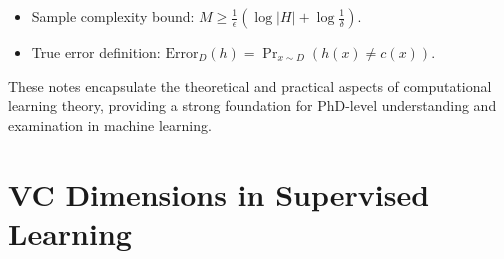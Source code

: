 \documentclass[
  12pt,
]{report}
\providecommand{\tightlist}{%
  \setlength{\itemsep}{0pt}\setlength{\parskip}{0pt}}
\begin{document}
\begin{enumerate}
\begin{itemize}
    \begin{itemize}
    \tightlist
    \item
      Sample complexity bound: \(M \geq \frac{1}{\epsilon}(\log|H| + \log\frac{1}{\delta})\).
    \item
      True error definition: \(\text{Error}_D(h) = \Pr_{x \sim D}(h(x) \neq c(x))\).
    \end{itemize}
  \end{itemize}
\end{enumerate}

These notes encapsulate the theoretical and practical aspects of computational learning theory, providing a strong foundation for PhD-level understanding and examination in machine learning.

\chapter{VC Dimensions in Supervised Learning}
\end{document}
